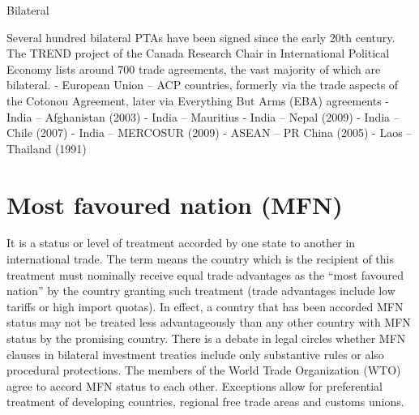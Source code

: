 \documentclass[
]{book}
\begin{document}
Bilateral

Several hundred bilateral PTAs have been signed since the early 20th century. The TREND project of the Canada Research Chair in International Political Economy lists around 700 trade agreements, the vast majority of which are bilateral.
- European Union -- ACP countries, formerly via the trade aspects of the Cotonou Agreement, later via Everything But Arms (EBA) agreements
- India -- Afghanistan (2003)
- India -- Mauritius
- India -- Nepal (2009)
- India -- Chile (2007)
- India -- MERCOSUR (2009)
- ASEAN -- PR China (2005)
- Laos -- Thailand (1991)

\hypertarget{most-favoured-nation-mfn}{%
\section{Most favoured nation (MFN)}\label{most-favoured-nation-mfn}}

It is a status or level of treatment accorded by one state to another in international trade. The term means the country which is the recipient of this treatment must nominally receive equal trade advantages as the ``most favoured nation'' by the country granting such treatment (trade advantages include low tariffs or high import quotas). In effect, a country that has been accorded MFN status may not be treated less advantageously than any other country with MFN status by the promising country. There is a debate in legal circles whether MFN clauses in bilateral investment treaties include only substantive rules or also procedural protections. The members of the World Trade Organization (WTO) agree to accord MFN status to each other. Exceptions allow for preferential treatment of developing countries, regional free trade areas and customs unions.
\end{document}
